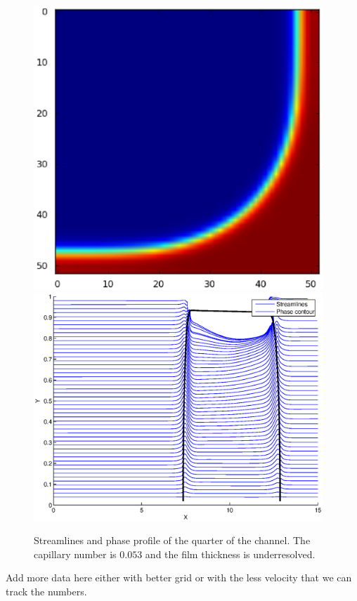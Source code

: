 \documentclass{article}
\begin{document}
\begin{figure}
\includegraphics[width=0.97\textwidth]{Figures/quarter.eps}\\ %
\includegraphics[width=0.97\textwidth]{Figures/stream_cap01.eps}\\
\caption{Streamlines and phase profile of the quarter of the channel. The capillary number is
$0.053$ and the film thickness is underresolved. \label{fig:quarter:capillary:capillary01}}
\end{figure}
{\color{red} Add more data here either with better grid or with the less velocity that we can
track the numbers.}
\end{document}
